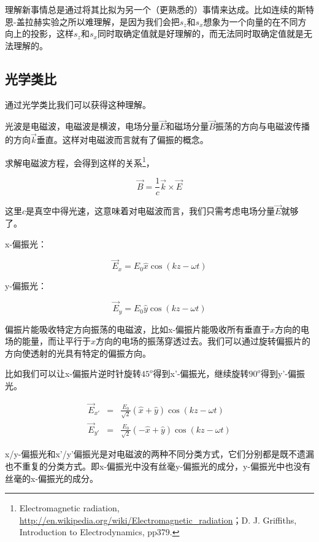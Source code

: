 理解新事情总是通过将其比拟为另一个（更熟悉的）事情来达成。比如连续的斯特恩-盖拉赫实验之所以难理解，是因为我们会把$s_z$和$s_x$想象为一个向量的在不同方向上的投影，这样$s_z$和$s_x$同时取确定值就是好理解的，而无法同时取确定值就是无法理解的。

\subsection{光学类比}

通过光学类比我们可以获得这种理解。

光波是电磁波，电磁波是横波，电场分量$\vec E$和磁场分量$\vec B$振荡的方向与电磁波传播的方向$\vec k$垂直。这样对电磁波而言就有了偏振的概念。

求解电磁波方程，会得到这样的关系\footnote{Electromagnetic radiation, \url{http://en.wikipedia.org/wiki/Electromagnetic_radiation}；D. J. Griffiths, Introduction to Electrodynamics, pp379.}，

\begin{equation}
\vec B = \frac{1}{c} \vec k \times \vec E 
\end{equation}

这里$c$是真空中得光速，这意味着对电磁波而言，我们只需考虑电场分量$\vec E$就够了。

x-偏振光：

\begin{equation}
\vec E_x = E_0 \hat x \cos (k z - \omega t )
\end{equation}

y-偏振光：

\begin{equation}
\vec E_y = E_0 \hat y \cos (k z - \omega t )
\end{equation}

偏振片能吸收特定方向振荡的电磁波，比如x-偏振片能吸收所有垂直于$x$方向的电场的能量，而让平行于$x$方向的电场的振荡穿透过去。我们可以通过旋转偏振片的方向使透射的光具有特定的偏振方向。

比如我们可以让x-偏振片逆时针旋转$45^o$得到x'-偏振光，继续旋转$90^o$得到y'-偏振光。

\begin{eqnarray}
\vec E_{x'} & = & \frac{E_0}{\sqrt 2} (\hat x + \hat y)  \cos (k z - \omega t ) \\
\vec E_{y'} & = & \frac{E_0}{\sqrt 2} ( - \hat x + \hat y)  \cos (k z - \omega t )
\end{eqnarray}

x/y-偏振光和x'/y'偏振光是对电磁波的两种不同分类方式，它们分别都是既不遗漏也不重复的分类方式。即x-偏振光中没有丝毫y-偏振光的成分，y-偏振光中也没有丝毫的x-偏振光的成分。

